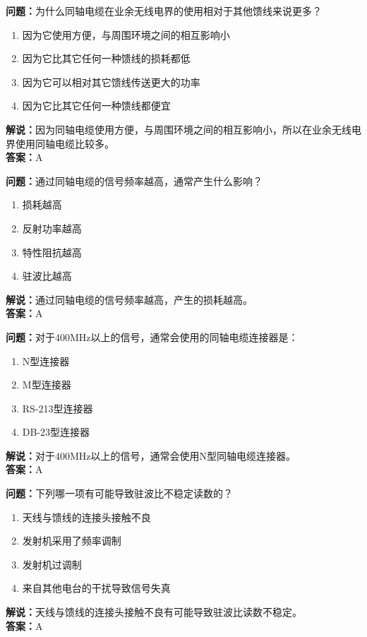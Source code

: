 \documentclass{ctexbook}%
\begin{document}
\textbf{问题：}为什么同轴电缆在业余无线电界的使用相对于其他馈线来说更多？
\begin{enumerate}[label=\Alph*), leftmargin=3em]
\item 因为它使用方便，与周围环境之间的相互影响小
\item 因为它比其它任何一种馈线的损耗都低
\item 因为它可以相对其它馈线传送更大的功率
\item 因为它比其它任何一种馈线都便宜
\end{enumerate}
\textbf{解说：}因为同轴电缆使用方便，与周围环境之间的相互影响小，所以在业余无线电界使用同轴电缆比较多。\\
\textbf{答案：}A

\textbf{问题：}通过同轴电缆的信号频率越高，通常产生什么影响？
\begin{enumerate}[label=\Alph*), leftmargin=3em]
\item 损耗越高
\item 反射功率越高
\item 特性阻抗越高
\item 驻波比越高
\end{enumerate}
\textbf{解说：}通过同轴电缆的信号频率越高，产生的损耗越高。\\
\textbf{答案：}A

\textbf{问题：}对于400MHz以上的信号，通常会使用的同轴电缆连接器是：
\begin{enumerate}[label=\Alph*), leftmargin=3em]
\item N型连接器
\item M型连接器
\item RS-213型连接器
\item DB-23型连接器
\end{enumerate}
\textbf{解说：}对于400MHz以上的信号，通常会使用N型同轴电缆连接器。\\
\textbf{答案：}A

\textbf{问题：}下列哪一项有可能导致驻波比不稳定读数的？
\begin{enumerate}[label=\Alph*), leftmargin=3em]
\item 天线与馈线的连接头接触不良
\item 发射机采用了频率调制
\item 发射机过调制
\item 来自其他电台的干扰导致信号失真
\end{enumerate}
\textbf{解说：}天线与馈线的连接头接触不良有可能导致驻波比读数不稳定。\\
\textbf{答案：}A
\end{document}
